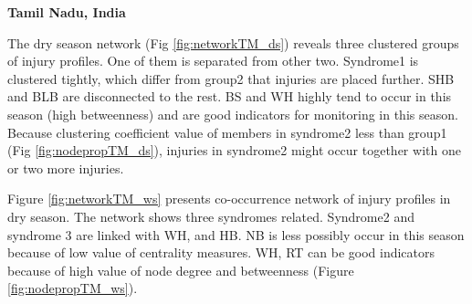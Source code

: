 \textbf{Tamil Nadu, India}

The dry season network (Fig \ref{fig:networkTM_ds}) reveals three clustered groups of injury profiles. One of them is separated from other two. Syndrome1 is clustered tightly, which differ from group2 that injuries are placed further. SHB and BLB are disconnected to the rest. BS and WH highly tend to occur in this season (high betweenness) and are good indicators for monitoring in this season. Because clustering coefficient value of members in syndrome2 less than group1 (Fig \ref{fig:nodepropTM_ds}), injuries in syndrome2 might occur together with one or two more injuries. 

Figure \ref{fig:networkTM_ws} presents co-occurrence network of injury profiles in dry season. The network shows three syndromes related. Syndrome2 and syndrome 3 are linked with WH, and HB. NB is less possibly occur in this season because of low value of centrality measures. WH, RT can be good indicators because of high value of node degree and betweenness (Figure \ref{fig:nodepropTM_ws}). 

